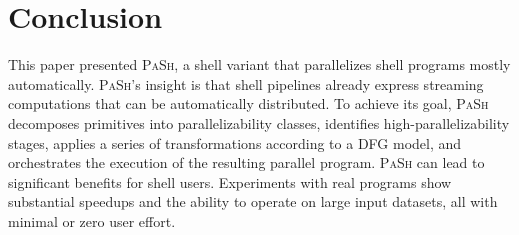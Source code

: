 \documentclass[sigplan, review, screen, anonymous]{acmart}
\newcommand{\km}[1]{[{\color{blue}km: #1}]}
\newcommand{\sys}{{\scshape PaSh}\xspace}
\begin{document}
  

\section{Conclusion}
\label{discussion}

This paper presented \sys, a shell variant that parallelizes shell programs mostly automatically.
\sys's insight is that shell pipelines already express streaming computations that can be automatically distributed.
To achieve its goal, \sys
  decomposes primitives into parallelizability classes,
  identifies high-parallelizability stages,
  applies a series of transformations according to a DFG model,
  and orchestrates the execution of the resulting parallel program.
%
%
  \sys can lead to significant benefits for shell users.
Experiments with real programs show substantial speedups and the ability to operate on large input datasets, all with minimal or zero user effort.
\end{document}
